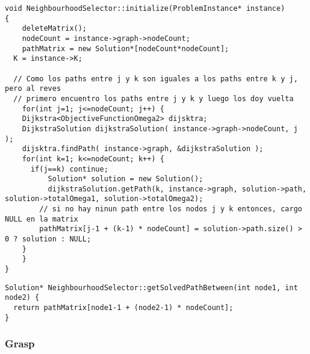 \begin{lstlisting}[caption=NeighbourhoodSelector::initialize()]
void NeighbourhoodSelector::initialize(ProblemInstance* instance)
{	
	deleteMatrix();
	nodeCount = instance->graph->nodeCount;
	pathMatrix = new Solution*[nodeCount*nodeCount];     
  K = instance->K;   

  // Como los paths entre j y k son iguales a los paths entre k y j, pero al reves
  // primero encuentro los paths entre j y k y luego los doy vuelta
	for(int j=1; j<=nodeCount; j++) {
  	Dijkstra<ObjectiveFunctionOmega2> dijsktra;          
    DijkstraSolution dijkstraSolution( instance->graph->nodeCount, j );                
    dijsktra.findPath( instance->graph, &dijkstraSolution );                      
    for(int k=1; k<=nodeCount; k++) {                    
      if(j==k) continue;
    	  Solution* solution = new Solution();        
    	  dijkstraSolution.getPath(k, instance->graph, solution->path, solution->totalOmega1, solution->totalOmega2);          
        // si no hay ninun path entre los nodos j y k entonces, cargo NULL en la matrix             
        pathMatrix[j-1 + (k-1) * nodeCount] = solution->path.size() > 0 ? solution : NULL;                                  
    }
	}
}
\end{lstlisting}
\begin{lstlisting}[caption=NeighbourhoodSelector::getSolvedPathBetween()]
Solution* NeighbourhoodSelector::getSolvedPathBetween(int node1, int node2) {  
  return pathMatrix[node1-1 + (node2-1) * nodeCount];
}
\end{lstlisting}
\subsubsection{Grasp}

